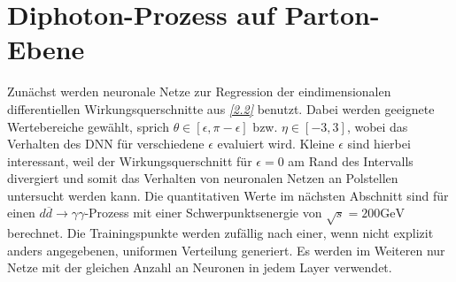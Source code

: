 \section{Diphoton-Prozess auf Parton-Ebene}
Zunächst werden neuronale Netze zur Regression der eindimensionalen differentiellen Wirkungsquerschnitte aus \textit{\autoref{2.2}} benutzt. Dabei werden geeignete Wertebereiche gewählt, sprich $\theta \in [\epsilon, \pi - \epsilon]$ bzw. $\eta \in [-3, 3]$, wobei das Verhalten des DNN für verschiedene $\epsilon$ evaluiert wird. Kleine $\epsilon$ sind hierbei interessant, weil der Wirkungsquerschnitt für $\epsilon = 0$ am Rand des Intervalls divergiert und somit das Verhalten von neuronalen Netzen an Polstellen untersucht werden kann. Die quantitativen Werte im nächsten Abschnitt sind für einen $d\overline{d} \rightarrow \gamma \gamma$-Prozess mit einer Schwerpunktsenergie von $\sqrt{s} = 200 \text{GeV}$ berechnet. Die Trainingspunkte werden zufällig nach einer, wenn nicht explizit anders angegebenen, uniformen Verteilung generiert.  
Es werden im Weiteren nur Netze mit der gleichen Anzahl an Neuronen in jedem Layer verwendet.

